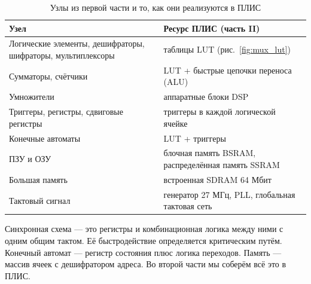 \begin{table}[H]
\centering
\caption{Узлы из первой части и то, как они реализуются в ПЛИС}
\small
\begin{tabularx}{\textwidth}{X X}
\toprule
\textbf{Узел} & \textbf{Ресурс ПЛИС (часть II)} \\
\midrule
Логические элементы, дешифраторы, шифраторы, мультиплексоры & таблицы LUT (рис.~\ref{fig:mux_lut}) \\
Сумматоры, счётчики & LUT + быстрые цепочки переноса (ALU) \\
Умножители & аппаратные блоки DSP \\
Триггеры, регистры, сдвиговые регистры & триггеры в каждой логической ячейке \\
Конечные автоматы & LUT + триггеры \\
ПЗУ и ОЗУ & блочная память BSRAM, распределённая память SSRAM \\
Большая память & встроенная SDRAM 64 Мбит \\
Тактовый сигнал & генератор 27 МГц, PLL, глобальная тактовая сеть \\
\bottomrule
\end{tabularx}
\end{table}

\begin{ideabox}
Синхронная схема --- это регистры и комбинационная логика между ними с одним
общим тактом. Её быстродействие определяется критическим путём. Конечный
автомат --- регистр состояния плюс логика переходов. Память --- массив ячеек
с дешифратором адреса. Во второй части мы соберём всё это в ПЛИС.
\end{ideabox}

